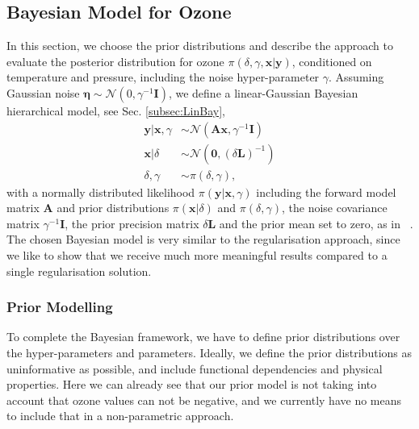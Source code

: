 \subsection{Bayesian Model for Ozone}
\label{subsec:OzoneSetup}
In this section, we choose the prior distributions and describe the approach to evaluate the posterior distribution for ozone $\pi(\delta, \gamma, \bm{x}|\bm{y})$, conditioned on temperature and pressure, including the noise hyper-parameter $\gamma$.
Assuming Gaussian noise $\bm{\eta} \sim \mathcal{N}(0, \gamma^{-1} \bm{I})$, we define a linear-Gaussian Bayesian hierarchical model, see Sec. \ref{subsec:LinBay},
\begin{subequations}
	\begin{align}
		\bm{y} |  \bm{x}, \gamma &\sim \mathcal{N}(\bm{A} \bm{x}, \gamma^{-1} \bm{I}) \label{eq:likelihood} \\
		\bm{x} |  \delta &\sim \mathcal{N}(\bm{0}, (\delta \bm{L})^{-1}) \label{eq:xPrior} \\
		\delta, \gamma &\sim \pi(\delta, \gamma) \label{eq:gammaPrior},
	\end{align}
	\label{eq:O3BayMode}
\end{subequations}
with a normally distributed likelihood $\pi(\bm{y} |  \bm{x}, \gamma)$ including the forward model matrix $\bm{A}$ and prior distributions $\pi(\bm{x} |  \delta)$ and $\pi(\delta, \gamma)$, the noise covariance matrix $\gamma^{-1} \bm{I}$, the prior precision matrix $\delta \bm{L}$ and the prior mean set to zero, as in ~\cite{fox2016fast}.
The chosen Bayesian model is very similar to the regularisation approach, since we like to show that we receive much more meaningful results compared to a single regularisation solution.


\subsubsection{Prior Modelling}
To complete the Bayesian framework, we have to define prior distributions over the hyper-parameters and parameters.
Ideally, we define the prior distributions as uninformative as possible, and include functional dependencies and physical properties.
Here we can already see that our prior model is not taking into account that ozone values can not be negative, and we currently have no means to include that in a non-parametric approach.


